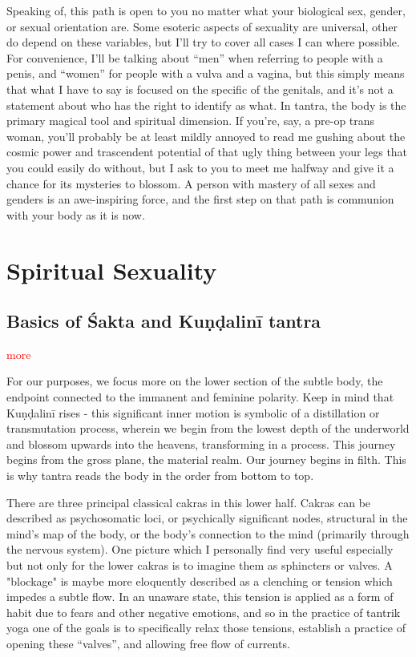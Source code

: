 \documentclass[a4paper,14pt]{memoir}
\newcommand{\kundalini}{Kuṇḍalinī}
\newcommand{\shakta}{Śakta}
\newcommand{\cmmnt}[1]{\textcolor{red}{#1}}
\begin{document}
Speaking of, this path is open to you no matter what your biological sex, gender, or sexual orientation are. Some esoteric aspects of sexuality are universal, other do depend on these variables, but I'll try to cover all cases I can where possible. For convenience, I'll be talking about ``men'' when referring to people with a penis, and ``women'' for people with a vulva and a vagina, but this simply means that what I have to say is focused on the specific of the genitals, and it's not a statement about who has the right to identify as what. In tantra, the body is the primary magical tool and spiritual dimension. If you're, say, a pre-op trans woman, you'll probably be at least mildly annoyed to read me gushing about the cosmic power and trascendent potential of that ugly thing between your legs that you could easily do without, but I ask to you to meet me halfway and give it a chance for its mysteries to blossom. A person with mastery of all sexes and genders is an awe-inspiring force, and the first step on that path is communion with your body as it is now.

\tableofcontents

\chapter{Spiritual Sexuality}

\section{Basics of \shakta{} and \kundalini{} tantra}

\cmmnt{more}

For our purposes, we focus more on the lower section of the subtle body, the endpoint connected to the immanent and feminine polarity. Keep in mind that \kundalini{} rises - this significant inner motion is symbolic of a distillation or transmutation process, wherein we begin from the lowest depth of the underworld and blossom upwards into the heavens, transforming in a process. This journey begins from the gross plane, the material realm. Our journey begins in filth. This is why tantra reads the body in the order from bottom to top.

There are three principal classical cakras in this lower half. Cakras can be described as psychosomatic loci, or psychically significant nodes, structural in the mind's map of the body, or the body's connection to the mind (primarily through the nervous system). One picture which I personally find very useful especially but not only for the lower cakras is to imagine them as sphincters or valves. A "blockage" is maybe more eloquently described as a clenching or tension which impedes a subtle flow. In an unaware state, this tension is applied as a form of habit due to fears and other negative emotions, and so in the practice of tantrik yoga one of the goals is to specifically relax those tensions, establish a practice of opening these ``valves'', and allowing free flow of currents.
\end{document}
